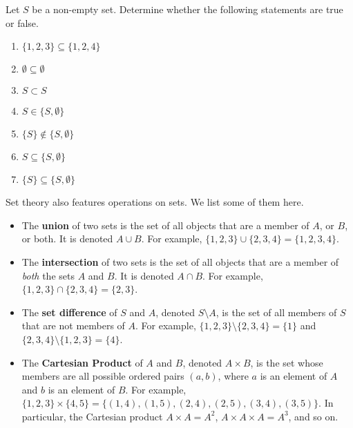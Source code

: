 \newpage

\begin{exercise}
    Let $S$ be a non-empty set. Determine whether the following statements are true or false.
    \begin{enumerate}[label=(\alph*)]
        \item $\{1, 2, 3\} \subseteq \{1, 2, 4\}$
        \item $\emptyset \subseteq \emptyset$
        \item $S \subset S$
        \item $S \in \{S, \emptyset\}$
        \item $\{S\} \notin \{S, \emptyset\}$
        \item $S \subseteq \{S, \emptyset\}$
        \item $\{S\} \subseteq \{S, \emptyset\}$
    \end{enumerate}
\end{exercise}

Set theory also features operations on sets. We list some of them here.
\begin{itemize}
    \item The \textbf{union} of two sets is the set of all objects that are a member of $A$, or $B$, or both. It is denoted $A \cup B$. For example, $\{1, 2, 3\} \cup \{2, 3, 4\} = \{1, 2, 3, 4\}$.
    \item The \textbf{intersection} of two sets is the set of all objects that are a member of \textit{both} the sets $A$ and $B$. It is denoted $A \cap B$. For example, $\{1, 2, 3\} \cap \{2, 3, 4\} = \{2, 3\}$.
    \item The \textbf{set difference} of $S$ and $A$, denoted $S \setminus A$, is the set of all members of $S$ that are not members of $A$. For example, $\{1, 2, 3\} \setminus \{2, 3, 4\} = \{1\}$ and $\{2, 3, 4\} \setminus \{1, 2, 3\} = \{4\}$.
    \item The \textbf{Cartesian Product} of $A$ and $B$, denoted $A \times B$, is the set whose members are all possible ordered pairs $(a, b)$, where $a$ is an element of $A$ and $b$ is an element of $B$. For example, $\{1, 2, 3\} \times \{4, 5\} = \{(1, 4), (1, 5), (2, 4), (2, 5), (3, 4), (3, 5)\}$. In particular, the Cartesian product $A \times A = A^2$, $A\times A \times A = A^3$, and so on.
\end{itemize}

\newpage

